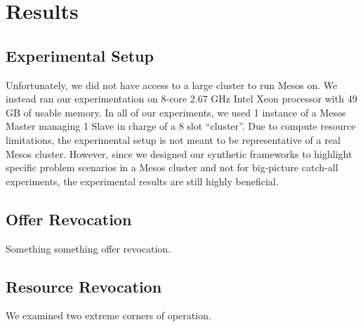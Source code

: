 \section{Results}
\label{sec:results}


\subsection{Experimental Setup}
Unfortunately, we did not have access to a large cluster to run Mesos on. We instead ran our
experimentation on 8-core 2.67 GHz Intel Xeon processor with 49 GB of usable memory. In all of our
experiments, we used 1 instance of a Mesos Master managing 1 Slave in charge of a 8 slot ``cluster''.
Due to compute resource limitations, the experimental setup is not meant to be representative of a real
Mesos cluster. However, since we designed our synthetic frameworks to highlight specific problem 
scenarios in a Mesos cluster and not for big-picture catch-all experiments, the experimental results
are still highly beneficial.

\subsection{Offer Revocation}
Something something offer revocation.

\subsection{Resource Revocation}
We examined two extreme corners of operation.

